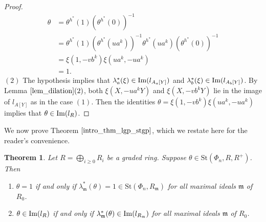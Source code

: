 \documentclass[11pt]{amsart}
\newtheorem{thm}{Theorem}[section]
\theoremstyle{definition}
\numberwithin{equation}{section}
\numberwithin{equation}{section}
\newcommand{\Img}{{\rm Im}}
\newcommand{\<}{\langle}
\renewcommand{\>}{\rangle}
\newcommand{\St}{\mathrm{St}}
\begin{document}
\begin{proof}
     \[\begin{split}
        \theta &=\theta^{h^{\ast}}(1)(\theta^{h^{\ast}}(0))^{-1}\\&=\theta^{h^{\ast}}(1)(\theta^{h^{\ast}}(ua^{k}))^{-1}\theta^{h^{\ast}}(ua^{k})(\theta^{h^{\ast}}(0))^{-1}\\
        &=\xi(1,-vb^{k})\xi(ua^{k},-ua^{k})\\
        &=1.
    \end{split}\]
    $(2)$ The hypothesis implies that $\lambda^{\ast}_{a}(\xi)\in\Img(l_{A_{a}[Y]})$ and $\lambda^{\ast}_{b}(\xi)\in\Img(l_{A_{b}[Y]})$. By Lemma $\ref{lem_dilation}(2)$, both $\xi(X,-ua^{k}Y)$ and  $\xi(X,-vb^{k}Y)$ lie in the image of $l_{A[Y]}$ as in the case $(1)$. Then the identities $\theta=\xi(1,-vb^{k})\xi(ua^{k},-ua^{k})$ implies that $\theta\in\Img(l_{R})$.
\end{proof}
We now prove Theorem $\ref{intro_thm_lgp_stgp}$, which we restate here for the reader’s convenience.
\begin{thm}\label{thm_lgp_stgp}
    Let $R=\bigoplus_{i\geq 0}R_{i}$ be a graded ring. Suppose $\theta\in \St(\Phi_{n},R, R^{+})$. Then \begin{enumerate}
        \item $\theta=1$ if and only if $\lambda^{\ast}_{\mathfrak{m}}(\theta)=1\in \St(\Phi_{n},R_{\mathfrak{m}})$ for all maximal ideals $\mathfrak{m}$ of $R_{0}$.
        \item $\theta\in\Img(l_{R})$ if and only if $\lambda^{\ast}_{\mathfrak{m}}(\theta)\in \Img(l_{R_{\mathfrak{m}}})$ for all maximal ideals $\mathfrak{m}$ of $R_{0}$.
    \end{enumerate}
\end{thm}
\end{document}
